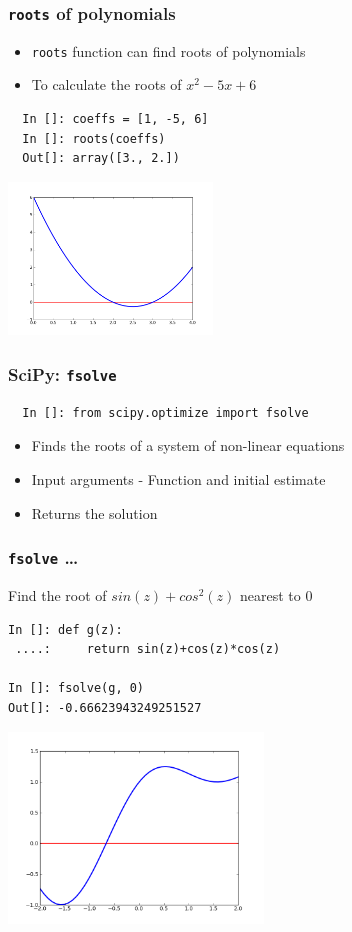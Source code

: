 \begin{frame}[fragile]
\frametitle{\texttt{roots} of polynomials}
\begin{itemize}
\item \texttt{roots} function can find roots of polynomials
\item To calculate the roots of $x^2-5x+6$ 
\end{itemize}
\begin{lstlisting}
  In []: coeffs = [1, -5, 6]
  In []: roots(coeffs)
  Out[]: array([3., 2.])
\end{lstlisting}
\vspace*{-.2in}
\begin{center}
\includegraphics[height=1.6in, interpolate=true]{images/roots}    
\end{center}
\end{frame}

\begin{frame}[fragile]
\frametitle{SciPy: \texttt{fsolve}}
\begin{small}
\begin{lstlisting}
  In []: from scipy.optimize import fsolve
\end{lstlisting}
\end{small}
\begin{itemize}
\item Finds the roots of a system of non-linear equations
\item Input arguments - Function and initial estimate
\item Returns the solution
\end{itemize}
\end{frame}

\begin{frame}[fragile]
\frametitle{\texttt{fsolve} \ldots}
Find the root of $sin(z)+cos^2(z)$ nearest to $0$
\begin{lstlisting}
In []: def g(z):
 ....:     return sin(z)+cos(z)*cos(z)

In []: fsolve(g, 0)
Out[]: -0.66623943249251527
\end{lstlisting}
\begin{center}
\includegraphics[height=2in, interpolate=true]{images/fsolve}    
\end{center}
\end{frame}

